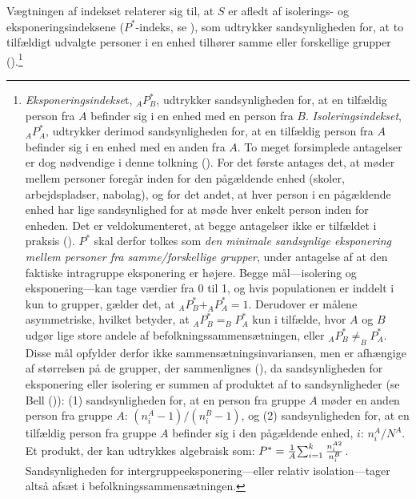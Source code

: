 \documentclass[
]{book}
\begin{document}
Vægtningen af indekset relaterer sig til, at \(S\) er afledt af isolerings- og eksponeringsindeksene (\(P^{*}\)-indeks, se ), som udtrykker sandsynligheden for, at to tilfældigt udvalgte personer i en enhed tilhører samme eller forskellige grupper ().\footnote{\emph{Eksponeringsindekse}t, \(_{A}P^{*}_{B}\), udtrykker sandsynligheden for, at en tilfældig person fra \(A\) befinder sig i en enhed med en person fra \(B\). \emph{Isoleringsindekset}, \(_{A}P^{*}_{A}\), udtrykker derimod sandsynligheden for, at en tilfældig person fra \(A\) befinder sig i en enhed med en anden fra \(A\). To meget forsimplede antagelser er dog nødvendige i denne tolkning (). For det første antages det, at møder mellem personer foregår inden for den pågældende enhed (skoler, arbejdspladser, nabolag), og for det andet, at hver person i en pågældende enhed har lige sandsynlighed for at møde hver enkelt person inden for enheden. Det er veldokumenteret, at begge antagelser ikke er tilfældet i praksis (). \(P^{*}\) skal derfor tolkes som \emph{den minimale sandsynlige eksponering mellem personer fra samme/forskellige grupper}, under antagelse af at den faktiske intragruppe eksponering er højere. Begge mål---isolering og eksponering---kan tage værdier fra 0 til 1, og hvis populationen er inddelt i kun to grupper, gælder det, at \(_{A}P^{*}_{B} + _{A}P^{*}_{A} = 1\). Derudover er målene asymmetriske, hvilket betyder, at \(_{A}P^{*}_{B} = _{B}P^{*}_{A}\) kun i tilfælde, hvor \(A\) og \(B\) udgør lige store andele af befolkningssammensætningen, eller \(_{A}P^{*}_{B} \neq _{B}P^{*}_{A}\). Disse mål opfylder derfor ikke sammensætningsinvariansen, men er afhængige af størrelsen på de grupper, der sammenlignes (), da sandsynligheden for eksponering eller isolering er summen af produktet af to sandsynligheder (se Bell ()): (1) sandsynligheden for, at en person fra gruppe \(A\) møder en anden person fra gruppe \(A\): \(\left( n_{i}^{A} - 1 \right) / \left( n_{i}^{B} - 1 \right)\), og (2) sandsynligheden for, at en tilfældig person fra gruppe \(A\) befinder sig i den pågældende enhed, \(i\): \(n_{i}^{A} / N^{A}\). Et produkt, der kan udtrykkes algebraisk som: \(P^{*}=\frac{1}{A} {\textstyle \sum_{i=1}^{k}\frac{n_{i}^{A \space 2}}{n_{i}^{B}}}\). Sandsynligheden for intergruppeeksponering---eller relativ isolation---tager altså afsæt i befolkningssammensætningen.}
\end{document}
